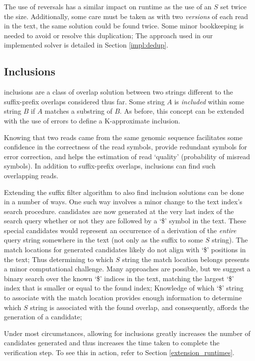 The use of reversals has a similar impact on runtime as the use of an $S$ set twice the size. Additionally, some care must be taken as with two \textit{versions} of each read in the \gls{text}, the same solution could be found twice. Some minor bookkeeping is needed to avoid or resolve this duplication; The approach used in our implemented \aspop{} solver is detailed in Section \ref{impl:dedup}.






\subsection{Inclusions}
\label{inclusions}

\Glspl{inclusion} are a class of overlap \gls{solution} between two strings different to the suffix-prefix overlaps considered thus far. Some string $A$ is \textit{included} within some string $B$ if $A$ matches a substring of $B$. As before, this concept can be extended with the use of \glspl{error} to define a \gls{K-approximate} inclusion.
 
Knowing that two \glspl{read} came from the same genomic sequence facilitates some confidence in the correctness of the read symbols, provide redundant symbols for error correction, and helps the estimation of read `quality' (probability of misread symbols). In addition to suffix-prefix overlaps, inclusions can find such overlapping reads.
 
Extending the \aspop{} \gls{suffix filter} algorithm to also find inclusion \glspl{solution} can be done in a number of ways. One such way involves a minor change to the \gls{text index}'s search procedure. \Glspl{candidate} are now generated at the very last index of the search \gls{query} whether or not they are followed by a `\$' symbol in the \gls{text}. These special candidates would represent an occurrence of a \gls{derivation} of the \textit{entire} query string somewhere in the text (not only as the suffix to some $S$ string). The \glspl{match location} for generated candidates likely do not align with `\$' positions in the text; Thus determining to which $S$ string the match location belongs presents a minor computational challenge. Many approaches are possible, but we suggest a binary search over the known `\$' indices in the text, matching the largest `\$' index that is smaller or equal to the found index; Knowledge of which `\$' string to associate with the match location provides enough information to determine which $S$ string is associated with the found overlap, and consequently, affords the generation of a candidate;
 
Under most circumstances, allowing for inclusions greatly increases the number of candidates generated and thus increases the time taken to complete the \gls{verification step}. To see this in action, refer to Section \ref{extension_runtimes}.